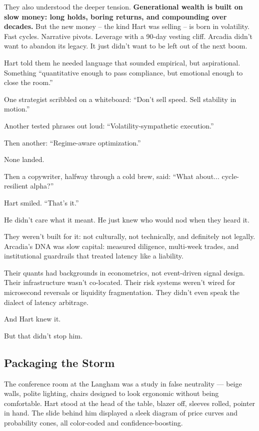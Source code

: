 \medskip

They also understood the deeper tension.
\textbf{Generational wealth is built on slow money: long holds, boring returns, and compounding over decades.}
But the new money -- the kind Hart was selling -- is born in volatility.
Fast cycles. Narrative pivots. Leverage with a 90-day vesting cliff.
Arcadia didn’t want to abandon its legacy.
It just didn’t want to be left out of the next boom.

Hart told them he needed language that sounded empirical, but aspirational.
Something ``quantitative enough to pass compliance, but emotional enough to close the room.''

One strategist scribbled on a whiteboard:
``Don’t sell speed. Sell stability in motion.''

Another tested phrases out loud: ``Volatility-sympathetic execution.''

Then another: ``Regime-aware optimization.''

None landed.

Then a copywriter, halfway through a cold brew, said:
``What about... cycle-resilient alpha?''

Hart smiled.
``That’s it.''

He didn’t care what it meant.
He just knew who would nod when they heard it.

They weren’t built for it: not culturally, not technically, and definitely not legally.
Arcadia’s DNA was slow capital: measured diligence, multi-week trades, and institutional guardrails that treated 
latency like a liability.

Their quants had backgrounds in econometrics, not event-driven signal design.
Their infrastructure wasn’t co-located.
Their risk systems weren’t wired for microsecond reversals or liquidity fragmentation.
They didn’t even speak the dialect of latency arbitrage.

And Hart knew it.

But that didn’t stop him.



\subsection{Packaging the Storm}

The conference room at the Langham was a study in false neutrality — beige walls, polite lighting, chairs designed to look ergonomic without being comfortable.  
Hart stood at the head of the table, blazer off, sleeves rolled, pointer in hand. The slide behind him displayed a sleek diagram of price curves and probability cones, all color-coded and confidence-boosting.

